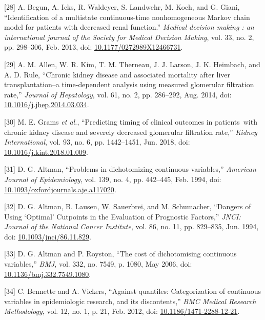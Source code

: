 \documentclass[12pt,twoside]{reedthesis}
\newenvironment{cslreferences}%
  {}%
  {\par}
\begin{document}
\begin{cslreferences}
\leavevmode\hypertarget{ref-begun_identification_2013-1}{}%
{[}28{]} A. Begun, A. Icks, R. Waldeyer, S. Landwehr, M. Koch, and G. Giani, ``Identification of a multistate continuous-time nonhomogeneous Markov chain model for patients with decreased renal function.'' \emph{Medical decision making : an international journal of the Society for Medical Decision Making}, vol. 33, no. 2, pp. 298--306, Feb. 2013, doi: \href{https://doi.org/10.1177/0272989X12466731}{10.1177/0272989X12466731}.

\leavevmode\hypertarget{ref-allen_chronic_2014-1}{}%
{[}29{]} A. M. Allen, W. R. Kim, T. M. Therneau, J. J. Larson, J. K. Heimbach, and A. D. Rule, ``Chronic kidney disease and associated mortality after liver transplantation--a time-dependent analysis using measured glomerular filtration rate,'' \emph{Journal of Hepatology}, vol. 61, no. 2, pp. 286--292, Aug. 2014, doi: \href{https://doi.org/10.1016/j.jhep.2014.03.034}{10.1016/j.jhep.2014.03.034}.

\leavevmode\hypertarget{ref-grams_predicting_2018}{}%
{[}30{]} M. E. Grams \emph{et al.}, ``Predicting timing of clinical outcomes in patients~with chronic kidney disease and severely decreased glomerular filtration rate,'' \emph{Kidney International}, vol. 93, no. 6, pp. 1442--1451, Jun. 2018, doi: \href{https://doi.org/10.1016/j.kint.2018.01.009}{10.1016/j.kint.2018.01.009}.

\leavevmode\hypertarget{ref-altman_problems_1994-1}{}%
{[}31{]} D. G. Altman, ``Problems in dichotomizing continuous variables,'' \emph{American Journal of Epidemiology}, vol. 139, no. 4, pp. 442--445, Feb. 1994, doi: \href{https://doi.org/10.1093/oxfordjournals.aje.a117020}{10.1093/oxfordjournals.aje.a117020}.

\leavevmode\hypertarget{ref-altman_dangers_1994-1}{}%
{[}32{]} D. G. Altman, B. Lausen, W. Sauerbrei, and M. Schumacher, ``Dangers of Using `Optimal' Cutpoints in the Evaluation of Prognostic Factors,'' \emph{JNCI: Journal of the National Cancer Institute}, vol. 86, no. 11, pp. 829--835, Jun. 1994, doi: \href{https://doi.org/10.1093/jnci/86.11.829}{10.1093/jnci/86.11.829}.

\leavevmode\hypertarget{ref-altman_cost_2006-1}{}%
{[}33{]} D. G. Altman and P. Royston, ``The cost of dichotomising continuous variables,'' \emph{BMJ}, vol. 332, no. 7549, p. 1080, May 2006, doi: \href{https://doi.org/10.1136/bmj.332.7549.1080}{10.1136/bmj.332.7549.1080}.

\leavevmode\hypertarget{ref-bennette_against_2012-1}{}%
{[}34{]} C. Bennette and A. Vickers, ``Against quantiles: Categorization of continuous variables in epidemiologic research, and its discontents,'' \emph{BMC Medical Research Methodology}, vol. 12, no. 1, p. 21, Feb. 2012, doi: \href{https://doi.org/10.1186/1471-2288-12-21}{10.1186/1471-2288-12-21}.


\end{cslreferences}
\end{document}
